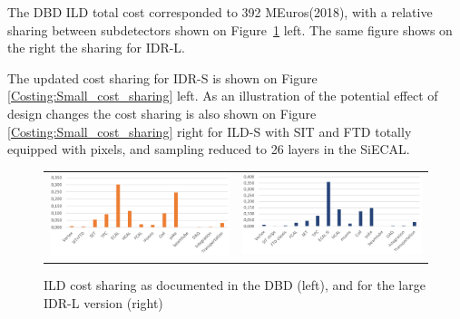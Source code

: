  The DBD ILD total cost corresponded to 392 MEuros(2018), with a relative sharing between subdetectors shown on Figure~\ref{fig:det:DBD_cost_sharing} left. The same figure shows on the right the sharing for IDR-L.
 
 The updated cost sharing for IDR-S is shown on Figure \ref{Costing:Small_cost_sharing} left. As an illustration of the potential effect of design changes the cost sharing is also shown on Figure \ref{Costing:Small_cost_sharing} right for ILD-S with SIT and FTD totally equipped with pixels, and sampling reduced to 26 layers in the SiECAL.
 
\begin{figure}[h!]
\begin{tabular}{cc}
\includegraphics[width=0.5\hsize]{Costing/DBD_cost_sharing.PNG}&
\includegraphics[width=0.5\hsize]{Costing/Large_cost_sharing.PNG}
\caption{ILD cost sharing as documented in the DBD (left), and for the large IDR-L version (right)}
\label{fig:det:DBD_cost_sharing}
\end{tabular}
\end{figure}


